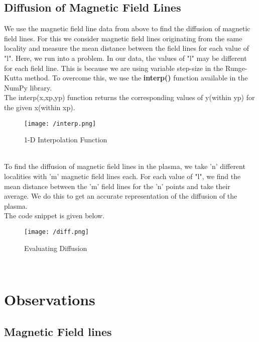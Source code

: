 \documentclass[fleqn]{report}
\begin{document}
	\section{Diffusion of Magnetic Field Lines}
	We use the magnetic field line data from above to find the diffusion of magnetic field lines. For this we consider magnetic field lines originating from the same locality and measure the mean distance between the field lines for each value of "l". Here, we run into a problem. In our data, the values of "l" may be different for each field line. This is because we are using variable step-size in the Runge-Kutta method. To overcome this, we use the \textbf{interp()} function available in the NumPy library.\\
	The interp(x,xp,yp) function returns the corresponding values of y(within yp) for the given x(within xp). 
	\begin{figure}[!ht]
		\centering
		\texttt{[image: /interp.png]}
		\caption{1-D Interpolation Function}
		\label{fig:interp}
	\end{figure}\\
	To find the diffusion of magnetic field lines in the plasma, we take 'n' different localities with 'm' magnetic field lines each. For each value of "l", we find the mean distance between the 'm' field lines for the 'n' points and take their average. We do this to get an accurate representation of the diffusion of the plasma.\\ 
	The code snippet is given below.
	\begin{figure}[!ht]
		\centering
		\texttt{[image: /diff.png]}
		\caption{Evaluating Diffusion}
		\label{fig:dif}
	\end{figure}\\ 	
	\chapter{Observations}
	\section{Magnetic Field lines}
\end{document}
